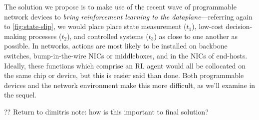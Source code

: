 \documentclass[sigconf,natbib=false]{acmart}
\newcounter{insightc}
\newenvironment{insight}
	{
		\begin{tipblock}\refstepcounter{insightc}\textbf{Insight \theinsightc:}\em
	}
	{
		\end{tipblock}
	}
\begin{document}

The solution we propose is to make use of the recent wave of programmable network devices to \emph{bring reinforcement learning to the dataplane}---referring again to \cref{fig:state-slip}, we would place place state measurement ($t_1$), low-cost decision-making processes ($t_2$), and controlled systems ($t_3$) as close to one another as possible.
In networks, actions are most likely to be installed on backbone switches, bump-in-the-wire NICs or middleboxes, and in the NICs of end-hosts.
Ideally, these functions which comprise an RL agent would all be collocated on the same chip or device, but this is easier said than done. 
Both programmable devices and the network environment make this more difficult, as we'll examine in the sequel.

?? Return to dimitris note: how is this important to final solution?

\end{document}

